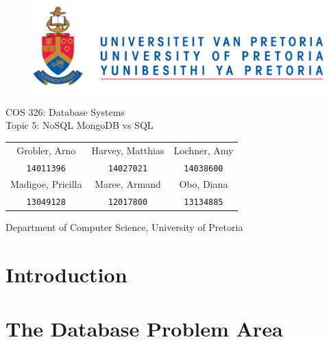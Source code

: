 \documentclass[hidelinks,english]{article}
\date{\today}
\begin{document}
	
	\begin{titlepage}
		\begin{figure}[!t]
			\includegraphics[width=\linewidth]{up_logo.png}
		\end{figure}
		\begin{center}
			\huge{COS 326: Database Systems}\\
			\huge{Topic 5: NoSQL MongoDB vs SQL}\\
			\vspace{10mm}
		\end{center}
		\begin{center}
			\begin{tabular}{ c c c }
				Grobler, Arno & Harvey, Matthias & Lochner, Amy  \\
				\texttt{14011396} & \texttt{14027021} & \texttt{14038600} \\
				Madigoe, Pricilla & Maree, Armand & Obo, Diana \\
				\texttt{13049128} & \texttt{12017800} & \texttt{13134885} \\				
			\end{tabular}
		\end{center}
		\begin{center}
			Department of Computer Science, University of Pretoria
		\end{center}
	\end{titlepage}
	\newpage
	\tableofcontents
	\newpage
	
   \section{Introduction}
   
   
   \section{The Database Problem Area}
\end{document}

